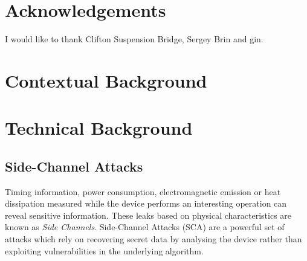 \documentclass[10pt,a4paper,twoside]{book}
\begin{document}

\chapter*{Acknowledgements}

\noindent
I would like to thank Clifton Suspension Bridge, Sergey Brin and gin.


\cleardoublepage
\pagestyle{marked}
\parindent=0in
\parskip=8pt 



\chapter{Contextual Background}
\label{chap:context}



\chapter{Technical Background}
\label{chap:technical}


\section{Side-Channel Attacks}

Timing information, power consumption, electromagnetic emission or heat dissipation measured while the device performs an interesting operation can reveal sensitive information. These leaks based on physical characteristics are known as \textit{Side Channels}. Side-Channel Attacks (SCA) are a powerful set of attacks which rely on recovering secret data by analysing the device rather than exploiting vulnerabilities in the underlying algorithm. 
\end{document}
